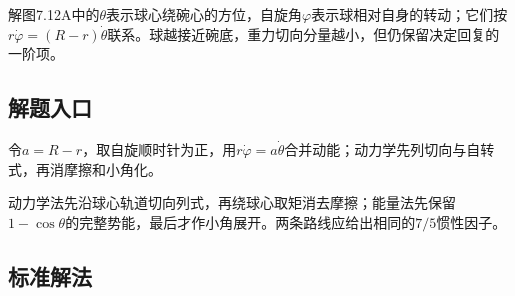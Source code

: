 \documentclass[UTF8,fontset=fandol,a4paper,11pt]{ctexart}
\begin{document}
解图7.12A中的$\theta$表示球心绕碗心的方位，自旋角$\varphi$表示球相对自身的转动；它们按$r\dot\varphi=(R-r)\dot\theta$联系。球越接近碗底，重力切向分量越小，但仍保留决定回复的一阶项。




\subsection*{解题入口}

令\(a=R-r\)，取自旋顺时针为正，用$ r\dot\varphi=a\dot\theta$合并动能；动力学先列切向与自转式，再消摩擦和小角化。

动力学法先沿球心轨道切向列式，再绕球心取矩消去摩擦；能量法先保留$1-\cos\theta$的完整势能，最后才作小角展开。两条路线应给出相同的$7/5$惯性因子。





\subsection*{标准解法}
\end{document}
